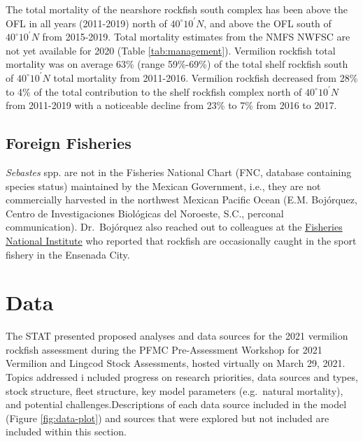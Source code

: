 \documentclass[11pt,
  english,
  a4paper,
]{article}
\begin{document}
The total mortality of the nearshore rockfish south complex has been above the OFL in all years (2011-2019) north of $40^\circ 10^\prime N$, and above the OFL south of $40^\circ 10^\prime N$ from 2015-2019. Total mortality estimates from the NMFS NWFSC are not yet available for 2020 (Table \ref{tab:management}). Vermilion rockfish total mortality was on average 63\% (range 59\%-69\%) of the total shelf rockfish south of $40^\circ 10^\prime N$ total mortality from 2011-2016. Vermilion rockfish decreased from 28\% to 4\% of the total contribution to the shelf rockfish complex north of $40^\circ 10^\prime N$ from 2011-2019 with a noticeable decline from 23\% to 7\% from 2016 to 2017.


\hypertarget{foreign-fisheries}{%
\subsection{Foreign Fisheries}\label{foreign-fisheries}}

\leavevmode\tagmcend\tagstructend

\emph{Sebastes} spp. are not in the Fisheries National Chart (FNC, database containing species status) maintained by the Mexican Government, i.e., they are not commercially harvested in the northwest Mexican Pacific Ocean (E.M. Bojórquez, Centro de Investigaciones Biológicas del Noroeste, S.C., perconal communication). Dr.~Bojórquez also reached out to colleagues at the {\href{https://www.gob.mx/inapesca}{Fisheries National Institute}\leavevmode\tagmcend\tagstructend} who reported that rockfish are occasionally caught in the sport fishery in the Ensenada City.


\hypertarget{data}{%
\section{Data}\label{data}}

\leavevmode\tagmcend\tagstructend

The STAT presented proposed analyses and data sources for the 2021 vermilion rockfish assessment during the PFMC Pre-Assessment Workshop for 2021 Vermilion and Lingcod Stock Assessments, hosted virtually on March 29, 2021. Topics addressed i ncluded progress on research priorities, data sources and types, stock structure, fleet structure, key model parameters (e.g.~natural mortality), and potential challenges.Descriptions of each data source included in the model (Figure \ref{fig:data-plot}) and sources that were explored but not included are included within this section.
\end{document}
